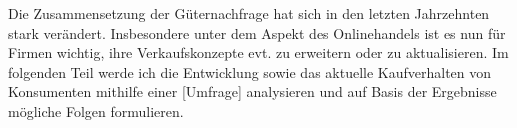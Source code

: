 Die Zusammensetzung der Güternachfrage hat sich in den letzten Jahrzehnten stark verändert. Insbesondere unter dem Aspekt des Onlinehandels ist es nun für Firmen wichtig, ihre Verkaufskonzepte evt. zu erweitern oder zu aktualisieren. Im folgenden Teil werde ich die Entwicklung sowie das aktuelle Kaufverhalten von Konsumenten mithilfe einer [Umfrage] analysieren und auf Basis der Ergebnisse mögliche Folgen formulieren.
